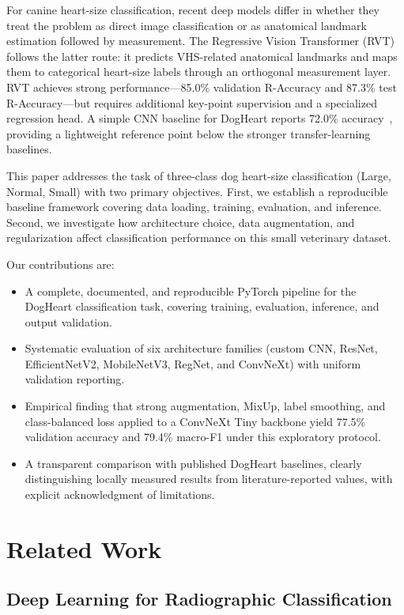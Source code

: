 \documentclass[10pt,twocolumn,letterpaper]{article}
\newcommand{\BestAccuracy}{77.5\%}
\newcommand{\BestMacroFOne}{79.4\%}
\begin{document}
For canine heart-size classification, recent deep models differ in whether they treat the problem as direct image classification or as anatomical landmark estimation followed by measurement. The Regressive Vision Transformer (RVT)~\cite{li2024regressive} follows the latter route: it predicts VHS-related anatomical landmarks and maps them to categorical heart-size labels through an orthogonal measurement layer. RVT achieves strong performance---85.0\% validation R-Accuracy and 87.3\% test R-Accuracy---but requires additional key-point supervision and a specialized regression head. A simple CNN baseline for DogHeart reports 72.0\% accuracy~\cite{deekonda2024simplecnn}, providing a lightweight reference point below the stronger transfer-learning baselines.

This paper addresses the task of three-class dog heart-size classification (Large, Normal, Small) with two primary objectives. First, we establish a reproducible baseline framework covering data loading, training, evaluation, and inference. Second, we investigate how architecture choice, data augmentation, and regularization affect classification performance on this small veterinary dataset.

Our contributions are:
\begin{itemize}
    \item A complete, documented, and reproducible PyTorch pipeline for the DogHeart classification task, covering training, evaluation, inference, and output validation.
    \item Systematic evaluation of six architecture families (custom CNN, ResNet, EfficientNetV2, MobileNetV3, RegNet, and ConvNeXt) with uniform validation reporting.
    \item Empirical finding that strong augmentation, MixUp, label smoothing, and class-balanced loss applied to a ConvNeXt Tiny backbone yield \BestAccuracy{} validation accuracy and \BestMacroFOne{} macro-F1 under this exploratory protocol.
    \item A transparent comparison with published DogHeart baselines, clearly distinguishing locally measured results from literature-reported values, with explicit acknowledgment of limitations.
\end{itemize}

\section{Related Work}\label{sec:related}

\subsection{Deep Learning for Radiographic Classification}
\end{document}
